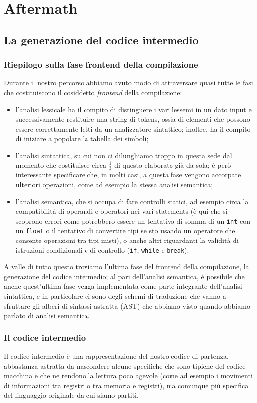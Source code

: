 \documentclass[class=book, crop=false, oneside, 12pt]{standalone}
\begin{document}
\part{Aftermath}
\chapter{La generazione del codice intermedio}
\section{Riepilogo sulla fase frontend della compilazione}
Durante il nostro percorso abbiamo avuto modo di attraversare quasi tutte le fasi che costituiscono il cosiddetto \emph{frontend} della compilazione:
\begin{itemize}
    \item l'analisi lessicale ha il compito di distinguere i vari lessemi in un dato input e successivamente restituire una string di tokens, ossia di elementi che possono essere correttamente letti da un analizzatore sintattico; inoltre, ha il compito di iniziare a popolare la tabella dei simboli;
    \item l'analisi sintattica, su cui non ci dilunghiamo troppo in questa sede dal momento che costituisce circa \(\frac{1}{3}\) di questo elaborato già da sola; è però interessante specificare che, in molti casi, a questa fase vengono accorpate ulteriori operazioni, come ad esempio la stessa analisi semantica;
    \item l'analisi semantica, che si occupa di fare controlli statici, ad esempio circa la compatibilità di operandi e operatori nei vari statements (è qui che si scoprono errori come potrebbero essere un tentativo di somma di un \texttt{int} con un \texttt{float} o il tentativo di convertire tipi se sto usando un operatore che consente operazioni tra tipi misti), o anche altri riguardanti la validità di istruzioni condizionali e di controllo (\texttt{if}, \texttt{while} e \texttt{break}).
\end{itemize}
A valle di tutto questo troviamo l'ultima fase del frontend della compilazione, la generazione del codice intermedio; al pari dell'analisi semantica, è possibile che anche quest'ultima fase venga implementata come parte integrante dell'analisi sintattica, e in particolare ci sono degli schemi di traduzione che vanno a sfruttare gli alberi di sintassi astratta (AST) che abbiamo visto quando abbiamo parlato di analisi semantica.

\section{Il codice intermedio}
Il codice  intermedio è una rappresentazione del nostro codice di partenza, abbastanza astratta da nascondere alcune specifiche che sono tipiche del codice macchina e che ne rendono la lettura poco agevole (come ad esempio i movimenti di informazioni tra registri o tra memoria e registri), ma comunque più specifica del linguaggio originale da cui siamo partiti.
\end{document}
